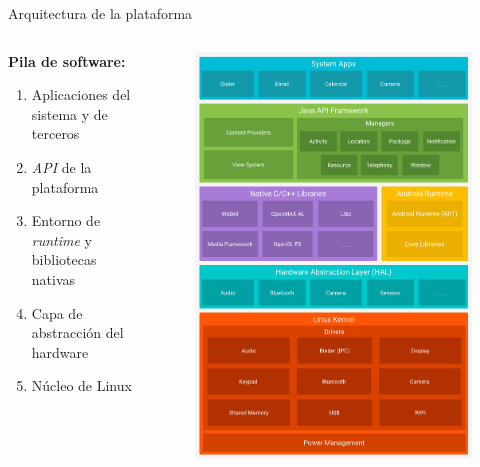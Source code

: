 \documentclass[pdf, handout]{beamer} %
\begin{document}
\begin{frame}{Arquitectura de la plataforma}
    \begin{columns}
        \begin{column}{.6\textwidth}
            \textbf{Pila de software:} \pause
            \begin{enumerate}[<+->]
                \item Aplicaciones del sistema y de terceros
                \item \textit{API} de la plataforma
                \item Entorno de \textit{runtime} y bibliotecas nativas
                \item Capa de abstracción del hardware
                \item Núcleo de Linux
            \end{enumerate}
        \end{column}

        \begin{column}{.4\textwidth}
            \begin{figure}
                \includegraphics[scale=0.09]{../imagenes/android-stack.png}
            \end{figure}
        \end{column}
    \end{columns}
\end{frame}
\end{document}
